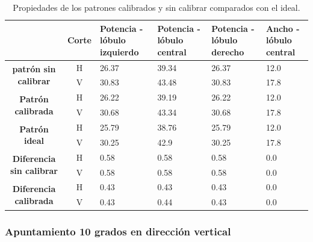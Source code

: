 \begin{table}[H]
  \footnotesize
  \centering
  \begin{tabular}{|c|c|p{2cm}|p{2cm}|p{2cm}|p{2cm}|}
    \cline{2-6}
    \multicolumn{1}{c|}{} & \textbf{Corte} & \textbf{Potencia - lóbulo izquierdo} & \textbf{Potencia - lóbulo central} &
    \textbf{Potencia - lóbulo derecho} & \textbf{Ancho - lóbulo central} \tabularnewline\hline
    \multirow{2}{*}{\textbf{patrón sin calibrar}} & H & 26.37 & 39.34 & 26.37 & 12.0 \tabularnewline\cline{2-6}
     & V & 30.83 & 43.48 & 30.83 & 17.8 \tabularnewline\hline
    \multirow{2}{*}{\textbf{Patrón calibrada}} & H & 26.22 & 39.19 & 26.22 & 12.0 \tabularnewline\cline{2-6}
     & V & 30.68 & 43.34 & 30.68 & 17.8 \tabularnewline\hline
    \multirow{2}{*}{\textbf{Patrón ideal}} & H & 25.79 & 38.76 & 25.79 & 12.0 \tabularnewline\cline{2-6}
     & V & 30.25 & 42.9 & 30.25 & 17.8 \tabularnewline\hline
    \multirow{2}{*}{\textbf{Diferencia sin calibrar}} & H & 0.58 & 0.58 & 0.58 & 0.0\tabularnewline\cline{2-6}
     & V & 0.58 & 0.58 & 0.58 & 0.0 \tabularnewline\hline
    \multirow{2}{*}{\textbf{Diferencia calibrada}} & H & 0.43 & 0.43 & 0.43 & 0.0 \tabularnewline\cline{2-6}
     & V & 0.43 & 0.44 & 0.43 & 0.0 \tabularnewline\hline
  \end{tabular}
  \caption{Propiedades de los patrones calibrados y sin calibrar comparados con el ideal.}
  \label{tab:nonErrMutual10degCol}
\end{table}


\subsubsection{Apuntamiento 10 grados en dirección vertical}

